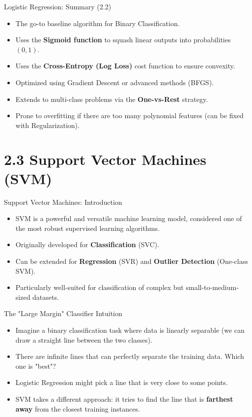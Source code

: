 \documentclass[aspectratio=169]{beamer}
\begin{document}
\begin{frame}{Logistic Regression: Summary (2.2)}
    \begin{itemize}
        \item The go-to baseline algorithm for Binary Classification.
        \item Uses the \textbf{Sigmoid function} to squash linear outputs into probabilities $(0, 1)$.
        \item Uses the \textbf{Cross-Entropy (Log Loss)} cost function to ensure convexity.
        \item Optimized using Gradient Descent or advanced methods (BFGS).
        \item Extends to multi-class problems via the \textbf{One-vs-Rest} strategy.
        \item Prone to overfitting if there are too many polynomial features (can be fixed with Regularization).
    \end{itemize}
\end{frame}

\section{2.3 Support Vector Machines (SVM)}

\begin{frame}{Support Vector Machines: Introduction}
\begin{itemize}
    \item SVM is a powerful and versatile machine learning model, considered one of the most robust supervised learning algorithms.
    \item Originally developed for \textbf{Classification} (SVC).
    \item Can be extended for \textbf{Regression} (SVR) and \textbf{Outlier Detection} (One-class SVM).
    \item Particularly well-suited for classification of complex but small-to-medium-sized datasets.
\end{itemize}
\end{frame}

\begin{frame}{The "Large Margin" Classifier Intuition}
\begin{itemize}
    \item Imagine a binary classification task where data is linearly separable (we can draw a straight line between the two classes).
    \item There are infinite lines that can perfectly separate the training data. Which one is "best"?
    \item Logistic Regression might pick a line that is very close to some points.
    \item SVM takes a different approach: it tries to find the line that is \textbf{farthest away} from the closest training instances.
\end{itemize}
\end{frame}
\end{document}
